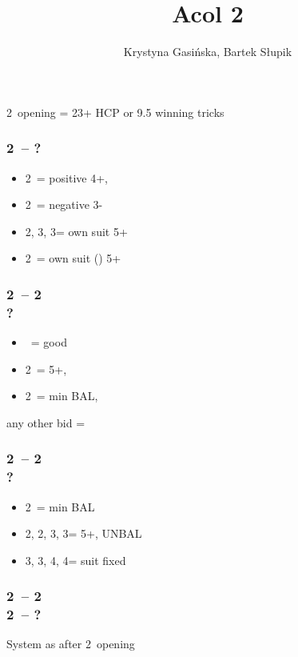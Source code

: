 \documentclass[12pt, a4paper]{article}
\title{Acol 2\clubsuit}
\author{Krystyna Gasińska, Bartek Słupik}
\begin{document}
\maketitle


2\clubs\ opening = 23+ HCP or 9.5 winning tricks

\subsubsection*{2\clubs\ -- ?}
\begin{itemize}
    \item 2\diams\ = positive 4+, \gf
    \item 2\hearts\ = negative 3-
    \item 2\spades, 3\clubs, 3\diams = own suit 5+
    \item 2\nt\ = own suit (\hearts) 5+
\end{itemize}

\subsubsection*{2\clubs\ -- 2\hearts \\ ?}
\begin{itemize}
    \item \pass\ = good \hearts
    \item 2\spades\ = 5+, \fonce
    \item 2\nt\ = min BAL, \nf
\end{itemize}

any other bid = \gf

\subsubsection*{2\clubs\ -- 2\diams \\ ?}
\begin{itemize}
    \item 2\nt\ = min BAL
    \item 2\hearts, 2\spades, 3\clubs, 3\diams = 5+, UNBAL
    \item 3\hearts, 3\spades, 4\clubs, 4\diams = suit fixed
\end{itemize}

\subsubsection*{2\clubs\ -- 2\diams \\ 2\nt\ -- ?}
System as after 2\nt\ opening
\end{document}
